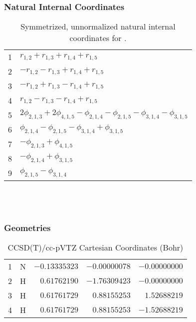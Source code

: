 \documentclass[10pt,oneside]{article}
\begin{document}
\subsubsection*{Natural Internal Coordinates}
\begin{table}[h!]
\centering
\caption{Symmetrized, unnormalized natural internal coordinates for .}
\small
\begin{tabular}{ll}
  1   & $r_{1,2} + r_{1,3} + r_{1,4} + r_{1,5}$ \\
  2   & $-r_{1,2} - r_{1,3} + r_{1,4} + r_{1,5}$ \\
  3   & $-r_{1,2} + r_{1,3} - r_{1,4} + r_{1,5}$ \\
  4   & $r_{1,2} - r_{1,3} - r_{1,4} + r_{1,5}$ \\
  5   & $2\phi_{2,1,3} + 2\phi_{4,1,5} - \phi_{2,1,4} - \phi_{2,1,5} - \phi_{3,1,4} - \phi_{3,1,5}$ \\
  6   & $\phi_{2,1,4} - \phi_{2,1,5} - \phi_{3,1,4} + \phi_{3,1,5}$ \\
  7   & $-\phi_{2,1,3} + \phi_{4,1,5}$ \\
  8   & $-\phi_{2,1,4} + \phi_{3,1,5}$ \\
  9   & $\phi_{2,1,5} - \phi_{3,1,4}$ \\
\end{tabular}
\end{table}

\clearpage

\subsection{\ \ \ }

\subsubsection*{Geometries}
\begin{table}[h!]
\centering
\caption{CCSD(T)/cc-pVTZ Cartesian Coordinates (Bohr)}
\begin{tabular}{llrrr}
1  & N  & $-0.13335323$ & $-0.00000078$ & $-0.00000000$ \\
2  & H  & $ 0.61762190$ & $-1.76309423$ & $-0.00000000$ \\
3  & H  & $ 0.61761729$ & $ 0.88155253$ & $ 1.52688219$ \\
4  & H  & $ 0.61761729$ & $ 0.88155253$ & $-1.52688219$ \\
\end{tabular}
\end{table}
\end{document}
